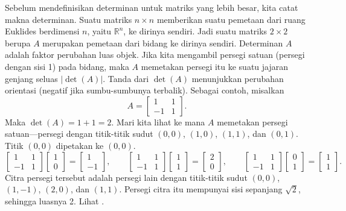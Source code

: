 Sebelum mendefinisikan
determinan untuk matriks yang lebih besar, kita catat
makna determinan.
Suatu matriks $n \times n$
memberikan suatu pemetaan dari ruang Euklides berdimensi $n$, yaitu ${\mathbb{R}}^n$, ke
dirinya sendiri.
Jadi suatu matriks $2 \times 2$ berupa $A$ merupakan pemetaan dari
bidang ke dirinya sendiri. Determinan
$A$ adalah faktor perubahan luas objek.
Jika kita mengambil persegi satuan (persegi dengan sisi 1) pada bidang, maka
$A$ memetakan persegi itu ke suatu jajaran genjang seluas $\lvert\det(A)\rvert$. Tanda
dari $\det(A)$ menunjukkan perubahan orientasi (negatif jika sumbu-sumbunya terbalik). Sebagai
contoh, misalkan
\begin{equation*}
A =
\begin{bmatrix}
1 & 1 \\
-1 & 1
\end{bmatrix} .
\end{equation*}
Maka $\det(A) = 1+1 = 2$.
Mari kita lihat ke mana $A$ memetakan persegi satuan---persegi dengan titik-titik sudut
$(0,0)$, $(1,0)$, $(1,1)$, dan $(0,1)$.
Titik $(0,0)$ dipetakan
ke $(0,0)$.
\begin{equation*}
\begin{bmatrix}
1 & 1 \\
-1 & 1
\end{bmatrix}
\begin{bmatrix}
1 \\ 0
\end{bmatrix} =
\begin{bmatrix}
1 \\
-1
\end{bmatrix}
,
\qquad
\begin{bmatrix}
1 & 1 \\
-1 & 1
\end{bmatrix}
\begin{bmatrix}
1 \\ 1
\end{bmatrix} =
\begin{bmatrix}
2 \\
0
\end{bmatrix}
,
\qquad
\begin{bmatrix}
1 & 1 \\
-1 & 1
\end{bmatrix}
\begin{bmatrix}
0 \\ 1
\end{bmatrix} =
\begin{bmatrix}
1 \\
1
\end{bmatrix}
.
\end{equation*}
Citra persegi tersebut adalah persegi lain dengan titik-titik sudut $(0,0)$, $(1,-1)$,
$(2,0)$, dan $(1,1)$. Persegi
citra itu mempunyai
sisi sepanjang $\sqrt{2}$, sehingga luasnya 2. Lihat
.

